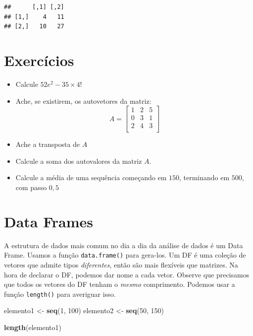 \documentclass[
]{article}
\newenvironment{Shaded}{\begin{snugshade}}{\end{snugshade}}
\newcommand{\DecValTok}[1]{\textcolor[rgb]{0.00,0.00,0.81}{#1}}
\newcommand{\KeywordTok}[1]{\textcolor[rgb]{0.13,0.29,0.53}{\textbf{#1}}}
\newcommand{\NormalTok}[1]{#1}
\newcommand{\StringTok}[1]{\textcolor[rgb]{0.31,0.60,0.02}{#1}}
\providecommand{\tightlist}{%
  \setlength{\itemsep}{0pt}\setlength{\parskip}{0pt}}
\begin{document}
\begin{verbatim}
##      [,1] [,2]
## [1,]    4   11
## [2,]   10   27
\end{verbatim}

\hypertarget{exercuxedcios}{%
\section{Exercícios}\label{exercuxedcios}}

\begin{itemize}
\tightlist
\item
  Calcule \(52e^2 - 35 \times 4!\)
\item
  Ache, se existirem, os autovetores da matriz: \[A = \begin{bmatrix}
  1&2&5\\
  0&3&1\\
  2&4&3\\
  \end{bmatrix}\]
\item
  Ache a transposta de \(A\)
\item
  Calcule a soma dos autovalores da matriz \(A\).
\item
  Calcule a média de uma sequência começando em \(150\), terminando em
  \(500\), com passo \(0,5\)
\end{itemize}

\hypertarget{data-frames}{%
\section{Data Frames}\label{data-frames}}

A estrutura de dados mais comum no dia a dia da análise de dados é um
Data Frame. Usamos a função \texttt{data.frame()} para gera-los. Um DF é
uma coleção de vetores que admite tipos \emph{diferentes}, então são
mais flexíveis que matrizes. Na hora de declarar o DF, podemos dar nome
a cada vetor. Observe que precisamos que todos os vetores do DF tenham o
\emph{mesmo} comprimento. Podemos usar a função \texttt{length()} para
averiguar isso.

\begin{Shaded}
\begin{Highlighting}[]
\NormalTok{elemento1 <-}\StringTok{ }\KeywordTok{seq}\NormalTok{(}\DecValTok{1}\NormalTok{, }\DecValTok{100}\NormalTok{)}
\NormalTok{elemento2 <-}\StringTok{ }\KeywordTok{seq}\NormalTok{(}\DecValTok{50}\NormalTok{, }\DecValTok{150}\NormalTok{)}

\KeywordTok{length}\NormalTok{(elemento1)}
\end{Highlighting}
\end{Shaded}
\end{document}
